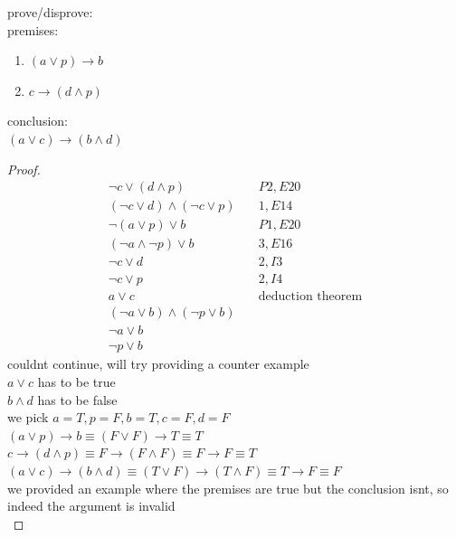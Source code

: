 \documentclass[a4paper,12pt]{article}
\begin{document}
\begin{question}
prove/disprove:\\[0pt]
premises:\\[0pt]
\begin{enumerate}
\item \((a \lor p) \to b\)\\[0pt]
\item \(c \to (d \land p)\)\\[0pt]
\end{enumerate}
conclusion:\\[0pt]
\((a \lor c) \to (b \land d)\)\\[0pt]
\begin{proof}
\begin{align}
  \lnot c \lor (d \land p) &\quad P2,E20\\
  (\lnot c \lor d) \land (\lnot c \lor p) &\quad 1,E14\\
  \lnot (a \lor p) \lor b &\quad P1,E20\\
  (\lnot a \land \lnot p) \lor b &\quad 3,E16\\
  \lnot c \lor d &\quad 2,I3\\
  \lnot c \lor p &\quad 2,I4\\
  a \lor c &\quad \text{deduction theorem}\\
  (\lnot a \lor b) \land (\lnot p \lor b)\\
  \lnot a \lor b\\
  \lnot p \lor b
\end{align}
couldnt continue, will try providing a counter example\\[0pt]
\(a \lor c\) has to be true\\[0pt]
\(b \land d\) has to be false\\[0pt]
we pick \(a=T,p=F,b=T,c=F,d=F\)\\[0pt]
\((a \lor p) \to b \equiv (F \lor F) \to T \equiv T\)\\[0pt]
\(c \to (d \land p) \equiv F \to (F \land F) \equiv F \to F \equiv T\)\\[0pt]
\((a \lor c) \to (b \land d) \equiv (T \lor F) \to (T \land F) \equiv T \to F \equiv F\)\\[0pt]
we provided an example where the premises are true but the conclusion isnt, so indeed the argument is invalid\\[0pt]
\end{proof}
\end{question}
\end{document}
